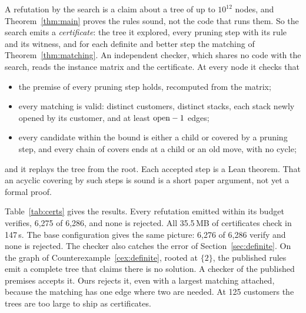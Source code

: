 A refutation by the search is a claim about a tree of up to $10^{12}$ nodes,
and Theorem~\ref{thm:main} proves the rules sound, not the code that runs
them. So the search emits a \emph{certificate}: the tree it explored, every
pruning step with its rule and its witness, and for each definite and better
step the matching of Theorem~\ref{thm:matching}. An independent checker, which
shares no code with the search, reads the instance matrix and the certificate.
At every node it checks that
\begin{itemize}
\item the premise of every pruning step holds, recomputed from the matrix;
\item every matching is valid: distinct customers, distinct stacks, each stack
  newly opened by its customer, and at least $\mathrm{open}-1$ edges;
\item every candidate within the bound is either a child or covered by a
  pruning step, and every chain of covers ends at a child or an old move,
  with no cycle;
\end{itemize}
and it replays the tree from the root. Each accepted step is a Lean theorem.
That an acyclic covering by such steps is sound is a short paper argument, not
yet a formal proof.

\begin{table}[t]
\centering\small
\caption{Every certificate the search emitted verifies, none is rejected, and
checking takes milliseconds. Certificates for the repaired rules, configuration
with better move, refuting the optimum minus one on the certified MOSP corpus
at 9--75 customers, with 60\,s to emit each. \emph{Not emitted}: the emitter
did not finish in time. Size is the compressed certificate; check time is the
independent checker's.}
\label{tab:certs}
\resizebox{\linewidth}{!}{}
\end{table}

Table~\ref{tab:certs} gives the results. Every refutation emitted within its
budget verifies, 6,275 of 6,286, and none is rejected. All 35.5\,MB of
certificates check in 147\,s. The base configuration gives the same picture:
6,276 of 6,286 verify and none is rejected. The checker also catches the error
of Section~\ref{sec:definite}. On the graph of
Counterexample~\ref{cex:definite}, rooted at $\{2\}$, the published rules emit
a complete tree that claims there is no solution. A checker of the published
premises accepts it. Ours rejects it, even with a largest matching attached,
because the matching has one edge where two are needed. At 125 customers the
trees are too large to ship as certificates.

